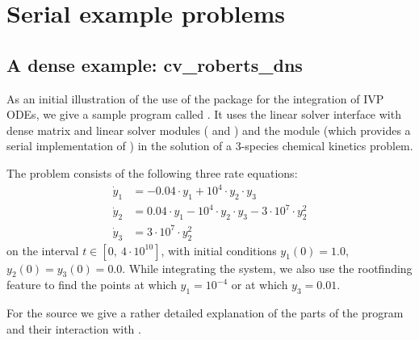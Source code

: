\section{Serial example problems}\label{s:ex_serial}

\subsection{A dense example: cv\_roberts\_dns}\label{ss:cv_roberts}

As an initial illustration of the use of the {\cvode} package for the
integration of IVP ODEs, we give a sample program called .
It uses the {\cvode} linear solver interface {\cvls} with
dense matrix and linear solver modules ({\sunmatdense} and {\sunlinsoldense})
and the {\nvecs} module (which provides a serial implementation of {\nvector})
in the solution of a 3-species chemical kinetics problem.

The problem consists of the following three rate equations:
\vspace*{-.08in}
\begin{equation}
  \begin{split}
    \dot{y}_1 &= -0.04 \cdot y_1 + 10^4 \cdot y_2 \cdot y_3 \\
    \dot{y}_2 &=  0.04 \cdot y_1 - 10^4 \cdot y_2 \cdot y_3
                                  - 3 \cdot 10^7 \cdot y_2^2 \\
    \dot{y}_3 &=  3 \cdot 10^7 \cdot y_2^2
  \end{split} 
\end{equation}
on the interval $t \in [0, ~4 \cdot 10^{10}]$, with initial conditions
$y_1(0) = 1.0$, $y_2(0) = y_3(0) = 0.0$.
While integrating the system, we also use the rootfinding
feature to find the points at which $y_1 = 10^{-4}$ or at which
$y_3 = 0.01$.

For the source we give a rather detailed explanation of the parts of the program and
their interaction with {\cvode}.

